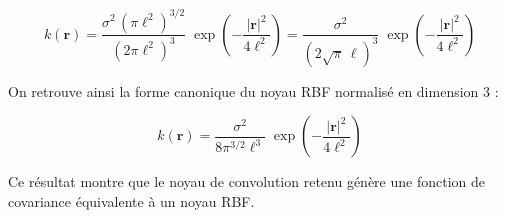 \begin{equation}
k(\mathbf{r}) = \frac{\sigma^2\,(\pi\ell^2)^{3/2}}{(2\pi\ell^2)^{3}}\; \exp\!\left(-\frac{|\mathbf{r}|^2}{4\ell^2}\right) = \frac{\sigma^2}{(2\sqrt{\pi}\,\ell)^{3}}\; \exp\!\left(-\frac{|\mathbf{r}|^2}{4\ell^2}\right)
\end{equation}

On retrouve ainsi la forme canonique du noyau RBF normalisé en dimension 3 :

\begin{equation}
\boxed{k(\mathbf{r}) = \frac{\sigma^2}{8\pi^{3/2}\ell^{3}}\; \exp\!\left(-\frac{|\mathbf{r}|^2}{4\ell^2}\right)}
\end{equation}

Ce résultat montre que le noyau de convolution retenu génère une fonction de covariance équivalente à un noyau RBF.
